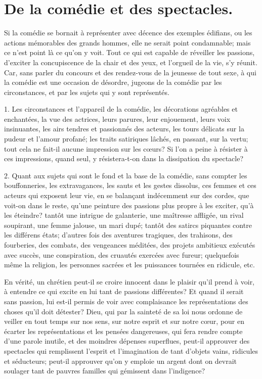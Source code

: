 \documentclass[instructions.tex]{subfiles}
\begin{document}
 
\chapter{De la comédie et des spectacles.}
 
\primo Si la comédie se bornait à représenter avec décence des exemples édifians, ou les actions mémorables des grands hommes, elle ne serait point condamnable; mais ce n’est point là ce qu’on y voit. Tout ce qui est capable de réveiller les passions, d’exciter la concupiscence de la chair et des yeux, et l’orgueil de la vie, s’y réunit. Car, sans parler du concours et des rendez-vous de la jeunesse de tout sexe, à qui la comédie est une occasion de désordre, jugeons de la comédie par les circonstances, et par les sujets qui y sont représentés.
 
1. Les circonstances et l’appareil de la comédie, les décorations agréables et enchantées, la vue des actrices, leurs parures, leur enjouement, leurs voix insinuantes, les airs tendres et passionnés des acteurs, les tours délicats sur la pudeur et l’amour profané; les traits satiriques lâchés, en passant, sur la vertu; tout cela ne fait-il aucune impression sur les cœurs? Si l’on a peine à résister à ces impressions, quand seul, y résistera-t-on dans la dissipation du spectacle?
 
2. Quant aux sujets qui sont le fond et la base de la comédie, sans compter les bouffonneries, les extravagances, les sauts et les gestes dissolus, ces femmes et ces acteurs qui exposent leur vie, en se balançant indécemment sur des cordes, que voit-on dans le reste, qu’une peinture des passions plus propre à les exciter, qu’à les éteindre? tantôt une intrigue de galanterie, une maîtresse affligée, un rival soupirant, une femme jalouse, un mari dupé; tantôt des satircs piquantes contre les différens états; d’autres fois des aventures tragiques, des trahisons, des fourberies, des combats, des vengeances méditées, des projets ambitieux exécutés avec succès, une conspiration, des cruautés exercées avec fureur; quelquefois même la religion, les personnes sacrées et les puissances tournées en ridicule, etc.
 
En vérité, un chrétien peut-il se croire innocent dans le plaisir qu’il prend à voir, à entendre ce qui excite en lui tant de passions différentes? Et quand il serait sans passion, lui est-il permis de voir avec complaisance les représentations des choses qu’il doit détester? Dieu, qui par la sainteté de sa loi nous ordonne de veiller en tout temps sur nos sens, sur notre esprit et sur notre cœur, pour en écarter les représentations et les pensées dangereuses, qui fera rendre compte d’une parole inutile, et des moindres dépenses superflues, peut-il approuver des spectacles qui remplissent l’esprit et l’imagination de tant d’objets vains, ridicules et séducteurs; peut-il approuver qu’on y emploie un argent dont on devrait soulager tant de pauvres familles qui gémissent dans l’indigence?
 
\end{document}
